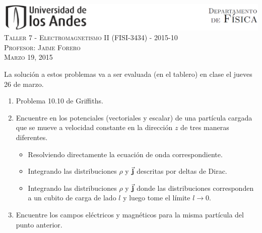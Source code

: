 \documentclass[letterpaper,10pt,onecolumn]{article}
\begin{document}
\begin{center}

\includegraphics[width=490pt]{header.png}\\[0.5cm]

\textsc{\LARGE Taller 7 - Electromagnetismo II (FISI-3434) - 2015-10}\\[0.5cm]

\textsc{\Large{Profesor: Jaime Forero}} \\[0.5cm]

\textsc{Marzo 19, 2015} \\[0.5cm]

\end{center}

La soluci\'on a estos problemas va a ser evaluada (en el tablero) en
clase el jueves 26 de marzo. 

\begin{enumerate}
\item Problema 10.10 de Griffiths.
\item Encuentre en los potenciales (vectoriales y escalar) de una
  part\'icula cargada que se mueve a velocidad constante en la
  direcci\'on $z$ de tres maneras diferentes.
\begin{itemize}
\item Resolviendo directamente la ecuaci\'on de onda correspondiente.
\item Integrando las distribuciones $\rho$ y $\vec{{\bf j}}$ descritas
  por deltas de Dirac. 
\item Integrando las distribuciones $\rho$ y $\vec{{\bf j}}$ donde las
  distribuciones corresponden a un cubito de carga de lado $l$ y luego
  tome el l\'imite $l\rightarrow 0$. 
\end{itemize}
\item Encuentre los campos el\'ectricos y magn\'eticos para la misma
  part\'icula del punto anterior.
\end{enumerate}
\end{document}
